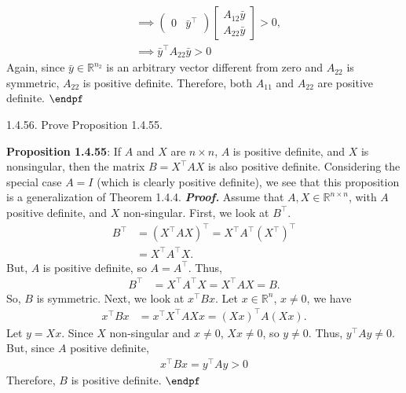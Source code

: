 \documentclass{report}
\begin{document}
\begin{remark}
\begin{align*}
        &\implies \begin{pmatrix} 0 & \bar{y}^{\top} \end{pmatrix} \begin{bmatrix} A_{12}\bar{y} \\ A_{22}\bar{y} \end{bmatrix} > 0, \\
        &\implies \bar{y}^{\top}A_{22}\bar{y} > 0
    \end{align*}
    Again, since $\bar{y} \in \mathbb{R}^{n_{2}}$ is an arbitrary vector different from zero and $A_{22}$ is symmetric, $A_{22}$ is positive definite.
    \bigbreak \noindent 
    Therefore, both $A_{11}$ and $A_{22}$ are positive definite. $\endpf$




    \pagebreak  \bigbreak \noindent 
    \begin{mdframed}
        1.4.56. Prove Proposition 1.4.55. 
    \end{mdframed}
    \bigbreak \noindent 
    \textbf{Proposition 1.4.55}: If $A$ and $X$ are $n\times n$, $A$ is positive definite, and $X$ is nonsingular,
    then the matrix $B = X^{\top} A X$ is also positive definite.
    \bigbreak \noindent 
    Considering the special case $A = I$ (which is clearly positive definite), we see that
    this proposition is a generalization of Theorem 1.4.4.
    \bigbreak \noindent 
    \textbf{\textit{Proof.}} Assume that $A,X \in \mathbb{R}^{n\times n}$, with $A$ positive definite, and $X$ non-singular. First, we look at $B^{\top}$.
    \begin{align*}
        B^{\top} &= (X^{\top}AX)^{\top} = X^{\top}A^{\top}\left(X^{\top}\right)^{\top} \\
                 &=X^{\top}A^{\top}X
    .\end{align*}
    But, $A $ is positive definite, so $A = A^{\top}$. Thus,
    \begin{align*}
        B^{\top} &= X^{\top}A^{\top}X = X^{\top}AX = B
    .\end{align*}
    So, $B $ is symmetric. Next, we look at $x^{\top}Bx$. Let $x\in \mathbb{R}^{n}$, $x\ne 0$, we have
    \begin{align*}
        x^{\top}Bx &= x^{\top}X^{\top}AXx = (Xx)^{\top}A(Xx)
    .\end{align*}
    Let $y = Xx$. Since $X$ non-singular and $ x \ne 0$, $Xx \ne 0$, so $y \ne 0$. Thus, $y^{\top}Ay \ne 0$. But, since $A$ positive definite, 
    \begin{align*}
        x^{\top}Bx = y^{\top}Ay > 0
    \end{align*}
    Therefore, $B$ is positive definite. $\endpf $


\end{remark}
\end{document}
